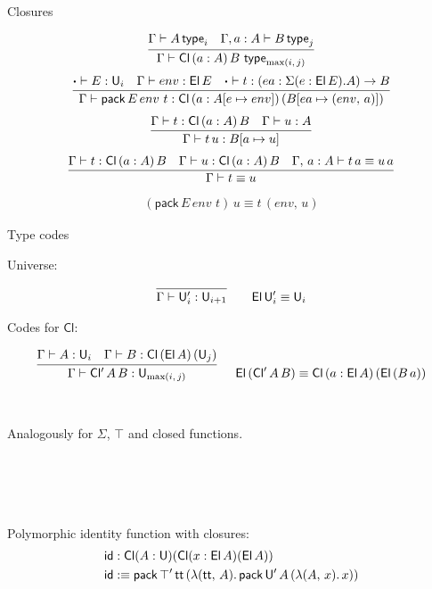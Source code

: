 \documentclass{beamer}
\newcommand{\type}{\mathsf{type}}
\newcommand{\Cl}{\mathsf{Cl}}
\newcommand{\pack}{\mathsf{pack}}
\begin{document}
\begin{frame}{Closures}

\begin{gather*}
  \infer{\Gamma \vdash \Cl\,(a : A)\,B\,\,\type_{\max(i,\,j)}}{\Gamma \vdash A\,\type_i & \Gamma, a : A \vdash B\,\type_j}
\end{gather*}
\begin{gather*}
\infer{\Gamma \vdash \pack\,E\,env\,\,t : \Cl\,(a : A[e\mapsto env])\,(B[ea \mapsto (env,\,a)])}{\boldsymbol{\cdot} \vdash E : \U_i & \Gamma \vdash env : \El\, E & \boldsymbol{\cdot} \vdash t : (ea : \Sigma(e : \El\,E).A) \ra B}
\end{gather*}
\begin{gather*}
  \infer{\Gamma \vdash t\,u : B[a \mapsto u]}{\Gamma \vdash t : \Cl\,(a : A)\,B & \Gamma \vdash u : A}
\end{gather*}
\begin{gather*}
  \infer{\Gamma \vdash t \equiv u}{\Gamma \vdash t : \Cl\,(a : A)\,B & \Gamma \vdash u : \Cl\,(a : A)\,B & \Gamma,\,a : A \vdash t\,a \equiv u\,a}
\end{gather*}
\begin{gather*}
  (\pack\,E\,env\,\,t)\,u \equiv t\,(env,\,u)
\end{gather*}
\end{frame}

\begin{frame}{Type codes}

Universe:

\begin{gather*}
\infer{\Gamma \vdash \U'_i : \U_{i+1}}{}\hspace{2em} \El\,\U'_i\equiv \U_i
\end{gather*}

Codes for $\Cl$:

\begin{gather*}
  \infer{\Gamma \vdash \mathsf{Cl'}\,A\,B : \U_{\max(i,\,j)}}
        {\Gamma \vdash A : \U_i & \Gamma \vdash B : \Cl\,(\El\,A)\,(\U_j)}
  \hspace{1.5em}
  \El\,(\mathsf{Cl'}\,A\,B)\equiv \Cl\,(a : \El\,A)\,(\El\,(B\,a))
\end{gather*}
\\~\\
Analogously for $\Sigma$, $\top$ and closed functions.

\end{frame}

\begin{frame}
\\~\\
\\~\\
Polymorphic identity function with closures:
  \begin{alignat*}{5}
    & \mathsf{id} : \Cl(A : \U)(\Cl(x : \El\,A)(\El\,A)) \\
    & \mathsf{id} :\equiv \pack\,\top'\,\tt\,(\lambda(\tt,\,A).\, \pack\,\U'\,A\,(\lambda(A,\,x).\,x))
\end{alignat*}
\end{frame}
\end{document}
